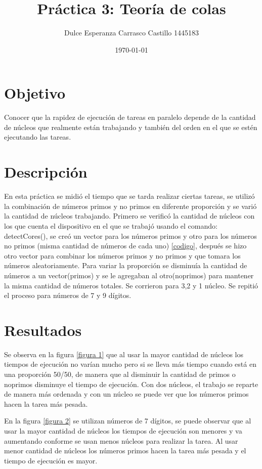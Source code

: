 \documentclass{article}
\author{Dulce Esperanza Carrasco Castillo 1445183}
\title{Práctica 3: Teoría de colas}
\date{\today}
\begin{document}
\maketitle

\section{Objetivo}
Conocer que la rapidez de ejecución de tareas en paralelo depende de la cantidad de núcleos que realmente están trabajando y también del orden en el que se estén ejecutando las tareas.

\section{Descripción}
En esta práctica se midió el tiempo que se tarda realizar ciertas tareas, se utilizó la combinación de números primos y no primos en diferente proporción y se varió la cantidad de núcleos trabajando. 
Primero se verificó la cantidad de núcleos con los que cuenta el dispositivo en el que se trabajó usando el comando: detectCores(), se creó un vector para los números primos y otro para los números no primos (misma cantidad de números de cada uno) \ref{codigo}, después se hizo otro vector para combinar los números primos y no primos y que tomara los números aleatoriamente. Para variar la proporción se disminuía la cantidad de números a un vector(primos) y se le agregaban al otro(noprimos) para mantener la misma cantidad de números totales. Se corrieron para 3,2 y 1 núcleo. Se repitió el proceso para números de 7 y 9 dígitos. 
 

\section{Resultados}

Se observa en la figura \ref{figura 1} que al usar la mayor cantidad de núcleos los tiempos de ejecución no varían mucho pero si se lleva más tiempo cuando está en una proporción 50/50, de manera que al disminuir la cantidad de primos o noprimos disminuye el tiempo de ejecución. Con dos núcleos, el trabajo se reparte de manera más ordenada y con un núcleo se puede ver que los números primos hacen la tarea más pesada.

En la figura \ref{figura 2} se utilizan números de 7 dígitos, se puede observar que al usar la mayor cantidad de núcleos los tiempos de ejecución son menores y va aumentando conforme se usan menos núcleos para realizar la tarea. Al usar menor cantidad de núcleos los números primos hacen la tarea más pesada y el tiempo de ejecución es mayor.
\end{document}
